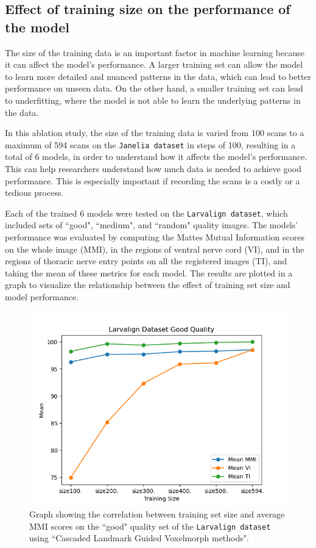 \documentclass{book}
\begin{document}
	\subsection{Effect of training size on the performance of the model}
	The size of the training data is an important factor in machine learning because it can affect the model's performance. A larger training set can allow the model to learn more detailed and nuanced patterns in the data, which can lead to better performance on unseen data. On the other hand, a smaller training set can lead to underfitting, where the model is not able to learn the underlying patterns in the data.
	
	In this ablation study, the size of the training data is varied from 100 scans to a maximum of 594 scans on the \texttt{Janelia dataset} in steps of 100, resulting in a total of 6 models, in order to understand how it affects the model's performance. This can help researchers understand how much data is needed to achieve good performance. This is especially important if recording the scans is a costly or a tedious process.
	
	Each of the trained 6 models were tested on the \texttt{Larvalign dataset}, which included sets of ``good", ``medium", and ``random" quality images. The models' performance was evaluated by computing the Mattes Mutual Information scores on the whole image (MMI), in the regions of ventral nerve cord (VI), and in the regions of thoracic nerve entry points on all the registered images (TI), and taking the mean of these metrics for each model. The results are plotted in a graph to visualize the relationship between the effect of training set size and model performance.
	
	\begin{figure}[h!]
		\centering
		\includegraphics[width=0.9\columnwidth]{resources/ablation_size/size_effect_good.png}
		\caption{Graph showing the correlation between training set size and average MMI scores on the ``good" quality set of the \texttt{Larvalign dataset} using ``Cascaded Landmark Guided Voxelmorph methods".}
		\label{fig:size_effect_good}
	\end{figure}
\end{document}

